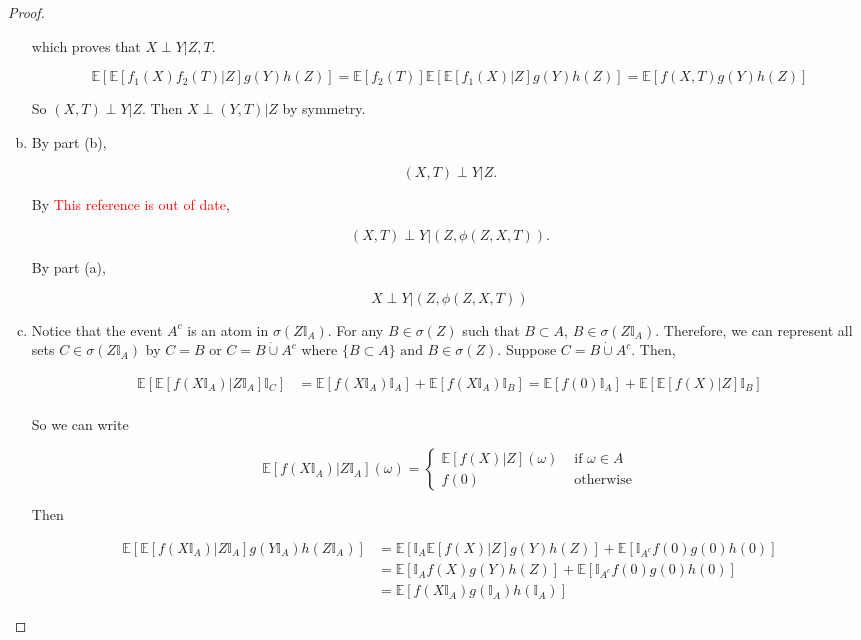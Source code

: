 \documentclass[12pt]{article}
\newcommand{\mb}{\mathbb}
\newcommand{\te}{\text}
\newcommand{\tr}{\textcolor{red}}
\newcommand{\ex}[1]{\mb{E}\left[#1\right]}			%
\newcommand{\Xf}{X}									%
\newcommand{\Xg}{Y}									%
\newcommand{\Xh}{Z}									%
\renewcommand{\it}[1]{_{#1}}						%
\newcommand{\Xj}{T}								%
\newcommand{\typset}{A}							%
\begin{document}
\begin{proof}
\begin{enumerate}[(a)]
which proves that \(\Xf\perp \Xg|\Xh,\Xj\).

\[\ex{\ex{f\it{1}(\Xf)f\it{2}(\Xj)|\Xh}g(\Xg)h(\Xh)} = \ex{f\it{2}(\Xj)}\ex{\ex{f\it{1}(\Xf)|\Xh}g(\Xg)h(\Xh)} = \ex{f(\Xf,\Xj)g(\Xg)h(\Xh)}\]

So \((\Xf,\Xj)\perp \Xg|\Xh\). Then \(\Xf\perp (\Xg,\Xj)|\Xh\) by symmetry.

\item By part (b), 

\[(\Xf,\Xj)\perp \Xg|\Xh.\]

By \cite[Lemma 2.10]{RamCur} \tr{This reference is out of date}, 

\[(\Xf,\Xj)\perp \Xg|(\Xh,\phi(\Xh,\Xf,\Xj)).\]

By part (a),

\[\Xf\perp \Xg|(\Xh,\phi(\Xh,\Xf,\Xj))\]

\item Notice that the event \(\typset^c\) is an atom in \(\sigma(\Xh\mb{I}_\typset)\). For any \(B \in \sigma(\Xh)\) such that \(B\subset \typset\), \(B \in \sigma(\Xh\mb{I}_\typset)\). Therefore, we can represent all sets \(C \in \sigma(\Xh\mb{I}_\typset)\) by \(C = B\) or \(C = B\dot{\cup} \typset^c\) where \(\{B\subset \typset\}\te{ and } B \in \sigma(\Xh)\). Suppose \(C = B\dot{\cup} \typset^c\). Then,

\begin{align*}
\ex{\ex{f(\Xf\mb{I}_\typset)|\Xh\mb{I}_\typset}\mb{I}_C} &= \ex{f(\Xf\mb{I}_\typset)\mb{I}_\typset}+\ex{f(\Xf\mb{I}_\typset)\mb{I}_B} = \ex{f(0)\mb{I}_\typset} + \ex{\ex{f(\Xf)|\Xh}\mb{I}_B}\\
\end{align*}

So we can write

\begin{equation}
\ex{f(\Xf\mb{I}_\typset)|\Xh\mb{I}_\typset}(\omega) = \begin{cases}
\ex{f(\Xf)|\Xh}(\omega) &\te{ if } \omega \in \typset\\
f(0) &\te{ otherwise}
\end{cases}
\label{TL::disjoint CE}
\end{equation}

Then

\begin{align*}
\ex{\ex{f(\Xf\mb{I}_\typset)|\Xh\mb{I}_\typset}g(\Xg\mb{I}_\typset)h(\Xh\mb{I}_\typset)} &= \ex{\mb{I}_\typset\ex{f(\Xf)|\Xh}g(\Xg)h(\Xh)} + \ex{\mb{I}_{\typset^c}f(0)g(0)h(0)}\\
&=\ex{\mb{I}_\typset f(\Xf)g(\Xg)h(\Xh)}+\ex{\mb{I}_{\typset^c}f(0)g(0)h(0)}\\
&= \ex{f(\Xf\mb{I}_\typset)g(\mb{I}_\typset)h(\mb{I}_\typset)}
\end{align*}


\end{enumerate}
\end{proof}
\end{document}
